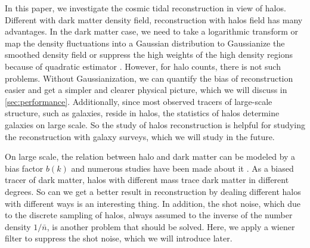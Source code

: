In this paper, we investigate the cosmic tidal reconstruction in view
of halos.
Different with dark matter density field, reconstruction with halos field has
many advantages. In the dark matter case, we need to take a logarithmic 
transform or map the density fluctuations into a Gaussian distribution to
Gaussianize the smoothed density field or suppress the high weights 
of the high density regions because of quadratic estimator
\citep{2012arXiv1202.5804P,2016PhRvD..93j3504Z,tides3d:Hu}.
However, for halo counts, there is not such problems. Without Gaussianization,
we can quantify the bias of reconstruction easier and get a simpler and 
clearer physical picture, which we will discuss in \ref{sec:performance}. 
Additionally, since most observed tracers of large-scale structure, 
such as galaxies, reside in halos, the statistics of halos determine
 galaxies on large scale. So the study of halos reconstruction is helpful
 for studying the reconstruction with galaxy surveys, 
 which we will study in the future.
 
On large scale, the relation between halo and dark matter can be modeled by
a bias factor $b(k)$ and numerous studies have been made about it
\citep{1986ApJ...304...15B,1996MNRAS.282..347M,1999MNRAS.308..119S,2001MNRAS.323....1S,2004MNRAS.355..129S,2011MNRAS.415..383M,2010ApJ...724..878T,2011JCAP...10..031B,2016MNRAS.458.1510S}.
As a biased tracer of dark matter, halos with different mass trace dark matter
in different degrees. 
{\color{blue}So can we get a better result in reconstruction by 
dealing different halos with different ways is an interesting thing.}
In addition, the shot noise, which due to the discrete sampling of halos,
always assumed to the inverse of the number density $1/\bar{n}$, is another
 problem that should be solved. 
 Here, we apply a wiener filter to suppress the shot noise, which
 we will introduce later.\\


